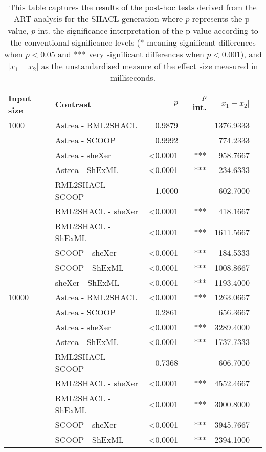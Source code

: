 \documentclass[10pt,a4paper]{article}
\begin{document}
\begin{table}[h]
\centering
\caption{This table captures the results of the post-hoc tests derived from the ART analysis for the SHACL generation where $p$ represents the p-value, $p$ int. the significance interpretation of the p-value according to the conventional significance levels (* meaning significant differences when $p < 0.05$ and *** very significant differences when $p < 0.001$), and $|\bar{x}_1 - \bar{x}_2|$ as the unstandardised measure of the effect size measured in milliseconds.}
\begin{tabular}{llrrrr}
Input size & Contrast & $p$ & $p$ int. & $|\bar{x}_1 - \bar{x}_2|$  \\
\hline
1000 & Astrea - RML2SHACL & 0.9879 &  & 1376.9333 &  \\
     & Astrea - SCOOP & 0.9992 &  & 774.2333 \\
     & Astrea - sheXer & \textless 0.0001 & *** & 958.7667 \\
     & Astrea - ShExML & \textless 0.0001 & *** & 234.6333  \\
     & RML2SHACL - SCOOP & 1.0000 & & 602.7000 \\
     & RML2SHACL - sheXer & \textless 0.0001 & *** & 418.1667 \\
     & RML2SHACL - ShExML & \textless 0.0001 & *** & 1611.5667 \\
     & SCOOP - sheXer & \textless 0.0001 & *** & 184.5333 \\
     & SCOOP - ShExML & \textless 0.0001 & *** & 1008.8667 \\
     & sheXer - ShExML & \textless 0.0001 & *** & 1193.4000 \\
\hline
10000 & Astrea - RML2SHACL & \textless 0.0001 & *** & 1263.0667 \\
      & Astrea - SCOOP & 0.2861 &  & 656.3667 \\
      & Astrea - sheXer & \textless 0.0001 & *** & 3289.4000 \\
      & Astrea - ShExML & \textless 0.0001 & *** & 1737.7333 \\
      & RML2SHACL - SCOOP & 0.7368 &  & 606.7000 \\
      & RML2SHACL - sheXer & \textless 0.0001 & *** & 4552.4667 \\
      & RML2SHACL - ShExML & \textless 0.0001 & *** &  3000.8000 \\
      & SCOOP - sheXer & \textless 0.0001 & *** & 3945.7667 \\
      & SCOOP - ShExML & \textless 0.0001 & *** & 2394.1000 \\

\end{tabular}
\end{table}
\end{document}
